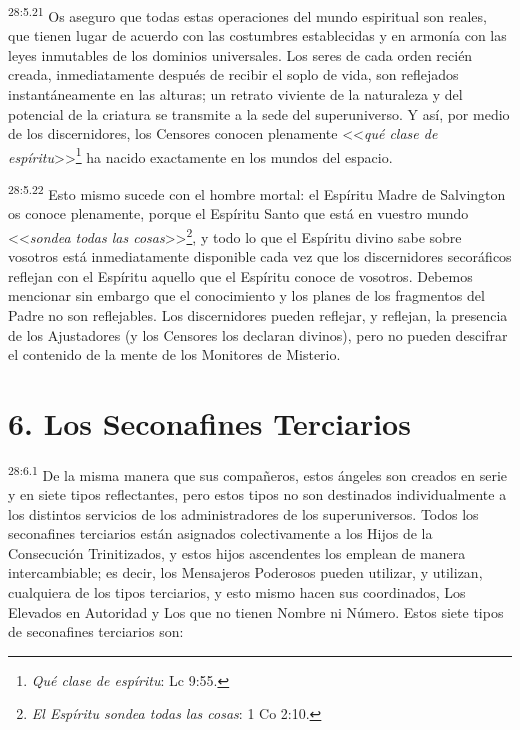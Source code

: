 \par
\textsuperscript{28:5.21} Os aseguro que todas estas operaciones del mundo espiritual son reales, que tienen lugar de acuerdo con las costumbres establecidas y en armonía con las leyes inmutables de los dominios universales. Los seres de cada orden recién creada, inmediatamente después de recibir el soplo de vida, son reflejados instantáneamente en las alturas; un retrato viviente de la naturaleza y del potencial de la criatura se transmite a la sede del superuniverso. Y así, por medio de los discernidores, los Censores conocen plenamente <<\textit{qué clase de espíritu}>>\footnote{\textit{Qué clase de espíritu}: Lc 9:55.} ha nacido exactamente en los mundos del espacio.

\par
\textsuperscript{28:5.22} Esto mismo sucede con el hombre mortal: el Espíritu Madre de Salvington os conoce plenamente, porque el Espíritu Santo que está en vuestro mundo <<\textit{sondea todas las cosas}>>\footnote{\textit{El Espíritu sondea todas las cosas}: 1 Co 2:10.}, y todo lo que el Espíritu divino sabe sobre vosotros está inmediatamente disponible cada vez que los discernidores secoráficos reflejan con el Espíritu aquello que el Espíritu conoce de vosotros. Debemos mencionar sin embargo que el conocimiento y los planes de los fragmentos del Padre no son reflejables. Los discernidores pueden reflejar, y reflejan, la presencia de los Ajustadores (y los Censores los declaran divinos), pero no pueden descifrar el contenido de la mente de los Monitores de Misterio.

\section*{6. Los Seconafines Terciarios}
\par
\textsuperscript{28:6.1} De la misma manera que sus compañeros, estos ángeles son creados en serie y en siete tipos reflectantes, pero estos tipos no son destinados individualmente a los distintos servicios de los administradores de los superuniversos. Todos los seconafines terciarios están asignados colectivamente a los Hijos de la Consecución Trinitizados, y estos hijos ascendentes los emplean de manera intercambiable; es decir, los Mensajeros Poderosos pueden utilizar, y utilizan, cualquiera de los tipos terciarios, y esto mismo hacen sus coordinados, Los Elevados en Autoridad y Los que no tienen Nombre ni Número. Estos siete tipos de seconafines terciarios son:

